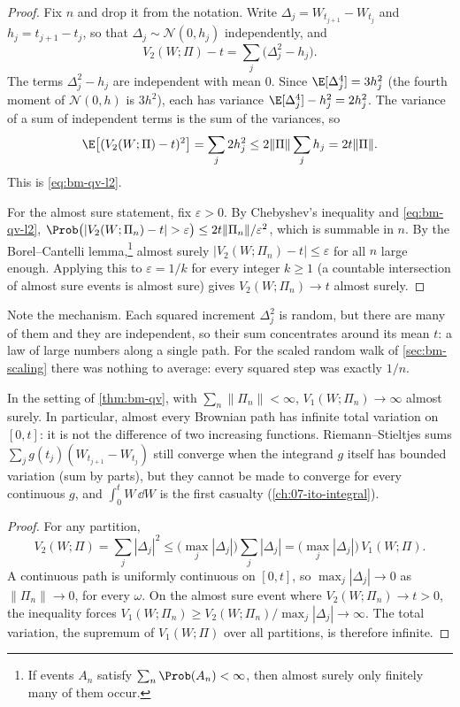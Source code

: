 \begin{proof}
Fix $n$ and drop it from the notation. Write $\Delta_j=W_{t_{j+1}}-W_{t_j}$ and
$h_j=t_{j+1}-t_j$, so that $\Delta_j\sim\mathcal N(0,h_j)$ independently, and
\[
  V_2(W;\Pi)-t=\sum_j\big(\Delta_j^2-h_j\big).
\]
The terms $\Delta_j^2-h_j$ are independent with mean $0$. Since
$\E[\Delta_j^4]=3h_j^2$ (the fourth moment of $\mathcal N(0,h)$ is $3h^2$), each has
variance $\E[\Delta_j^4]-h_j^2=2h_j^2$. The variance of a sum of independent terms is the
sum of the variances, so
\[
  \E\big[(V_2(W;\Pi)-t)^2\big]=\sum_j2h_j^2\le2\|\Pi\|\sum_jh_j=2t\|\Pi\| .
\]
This is \eqref{eq:bm-qv-l2}.

For the almost sure statement, fix $\varepsilon>0$. By Chebyshev's inequality and
\eqref{eq:bm-qv-l2},
$\Prob\big(|V_2(W;\Pi_n)-t|>\varepsilon\big)\le2t\|\Pi_n\|/\varepsilon^2$, which is summable
in $n$. By the Borel--Cantelli lemma,\footnote{If events $A_n$ satisfy
$\sum_n\Prob(A_n)<\infty$, then almost surely only finitely many of them occur.} almost
surely $|V_2(W;\Pi_n)-t|\le\varepsilon$ for all $n$ large enough. Applying this to
$\varepsilon=1/k$ for every integer $k\ge1$ (a countable intersection of almost sure
events is almost sure) gives $V_2(W;\Pi_n)\to t$ almost
surely.
\end{proof}

Note the mechanism. Each squared increment $\Delta_j^2$ is random, but there are many of
them and they are independent, so their sum concentrates around its mean $t$: a law of
large numbers along a single path. For the scaled random walk of \cref{sec:bm-scaling}
there was nothing to average: every squared step was exactly $1/n$.

\begin{corollary}\label{cor:bm-fv}
In the setting of \cref{thm:bm-qv}, with $\sum_n\|\Pi_n\|<\infty$,
$V_1(W;\Pi_n)\to\infty$ almost surely. In particular, almost every Brownian path has
infinite total variation on $[0,t]$: it is not the difference of two increasing
functions. Riemann--Stieltjes sums $\sum_jg(t_j)(W_{t_{j+1}}-W_{t_j})$ still converge when
the integrand $g$ itself has bounded variation (sum by parts), but they cannot be made to
converge for every continuous $g$, and $\int_0^tW\,\dd W$ is the first casualty
(\cref{ch:07-ito-integral}).
\end{corollary}

\begin{proof}
For any partition,
\[
  V_2(W;\Pi)=\sum_j|\Delta_j|^2\le\Big(\max_j|\Delta_j|\Big)\sum_j|\Delta_j|
  =\Big(\max_j|\Delta_j|\Big)\,V_1(W;\Pi).
\]
A continuous path is uniformly continuous on $[0,t]$, so $\max_j|\Delta_j|\to0$ as
$\|\Pi_n\|\to0$, for every $\omega$. On the almost sure event where
$V_2(W;\Pi_n)\to t>0$, the inequality forces $V_1(W;\Pi_n)\ge V_2(W;\Pi_n)/\max_j|\Delta_j|\to\infty$.
The total variation, the supremum of $V_1(W;\Pi)$ over all partitions, is therefore
infinite.
\end{proof}

